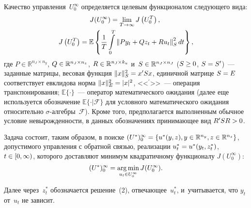 \begin{multicols}{2}
     Качество управления~$U_0^\infty$ определяется целевым 
функционалом сле\-ду\-юще\-го вида:
     \begin{multline}
     \!\! J(U_0^\infty) =\lim\limits_{T\to\infty} J\left(U_0^{{T}}\right),\\
      J\left(U_0^{{T}}\right) =\mathbb{E}\left\{ \displaystyle\frac{\displaystyle 1\mathstrut}{\displaystyle T\mathstrut}\int\limits_0^{{T}} \left\| Py_t+Qz_t+Ru_t\right\|_S^2 
dt\right\},
     \label{e3-bos}
     \end{multline}
где $P\in \mathbb{R}^{n_J\times n_y}$, $Q\hm\in \mathbb{R}^{n_J\times n_z}$, $R\hm\in \mathbb{R}^{n_J\times k_u}$ 
и~$S\hm\in \mathbb{R}^{n_J\times n_J}$ ($S\hm\geq 0$, $S\hm= S^\prime$)~--- заданные 
матрицы, весовая функция $\| x\|_S^2\hm= x^\prime Sx$, единичной матрице 
$S\hm= E$ соответствует евклидова норма $\| x\|_E^2\hm= \vert x\vert^2$, 
<<${}^\prime$>>~--- операция транспонирования; $\mathbb{E}\{\cdot\}$~--- 
оператор математического ожидания (далее еще используется обозначение 
$\mathbb{E}\{ \cdot\vert\mathcal{F}\}$ для условного математического 
ожидания относительно $\sigma$-ал\-геб\-ры~$\mathcal{F}$). Кроме того, 
предполагается выполненным обычное условие не\-вы\-рож\-ден\-ности, в данных 
обозначениях принимающее вид $R^\prime SR\hm>0$.
     
     Задача состоит, таким образом, в поиске 
     $(U^*)_0^\infty \hm= \{ u^*(y,z), y\hm\in \mathbb{R}^{n_y}, z\hm\in 
\mathbb{R}^{n_z}\}$, допустимого управления с обратной связью, 
реализации $u_t^*\hm= u^*(y_t, z_t^*)$, $t\hm\in [0,\infty)$, которого 
доставляют минимум квад\-ра\-тич\-но\-му функционалу $J(U_0^\infty)$: 
     \begin{equation}
     (U^*)_0^\infty =\mathop{\mathrm{arg}\,\mathrm{min}}\limits_{u_t\in U_0^\infty} J(U_0^\infty).
     \label{e4-bos}
     \end{equation}
     
     Далее через~$z_t^*$ обозначается решение~(2), от\-ве\-ча\-ющее~$u_t^*$, 
и~учитывается, что $y_t$ от~$u_t$ не зависит.
     

\end{multicols}
